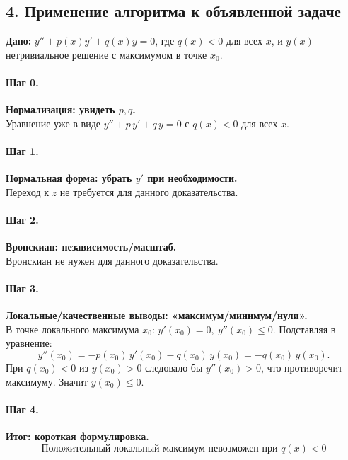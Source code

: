 \subsection*{4. Применение алгоритма к объявленной задаче}

\textbf{Дано:} \(y''+p(x)y'+q(x)y=0\), где \(q(x)<0\) для всех \(x\), и \(y(x)\) — нетривиальное решение с максимумом в точке \(x_0\).

\paragraph{Шаг 0.} \textbf{Нормализация: увидеть \(p,q\).}\\
Уравнение уже в виде \(y''+p\,y'+q\,y=0\) с \(q(x)<0\) для всех \(x\).

\paragraph{Шаг 1.} \textbf{Нормальная форма: убрать \(y'\) при необходимости.}\\
Переход к \(z\) не требуется для данного доказательства.

\paragraph{Шаг 2.} \textbf{Вронскиан: независимость/масштаб.}\\
Вронскиан не нужен для данного доказательства.

\paragraph{Шаг 3.} \textbf{Локальные/качественные выводы: «максимум/минимум/нули».}\\
В точке локального максимума \(x_0\):
\(y'(x_0)=0,\ y''(x_0)\le0\). Подставляя в уравнение:
\[
y''(x_0)=-p(x_0)\,y'(x_0)-q(x_0)\,y(x_0)= -q(x_0)\,y(x_0).
\]
При \(q(x_0)<0\) из \(y(x_0)>0\) следовало бы \(y''(x_0)>0\), что противоречит максимуму.
Значит \(y(x_0)\le0\).

\paragraph{Шаг 4.} \textbf{Итог: короткая формулировка.}\\
\[
\boxed{\,\text{Положительный локальный максимум невозможен при } q(x)<0\,}
\]

